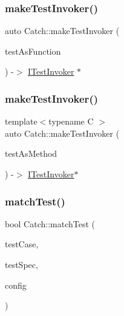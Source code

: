 \subsubsection{\texorpdfstring{make\+Test\+Invoker()}{makeTestInvoker()}\hspace{0.1cm}{\footnotesize\ttfamily [1/2]}}
{\footnotesize\ttfamily auto Catch\+::make\+Test\+Invoker (\begin{DoxyParamCaption}\item[{void($\ast$)()}]{test\+As\+Function }\end{DoxyParamCaption}) -\/$>$  \mbox{\hyperlink{structCatch_1_1ITestInvoker}{I\+Test\+Invoker}} $\ast$\hspace{0.3cm}{\ttfamily [noexcept]}}

\mbox{\label{namespaceCatch_a82a954c4d70afa716115820dc7dc8d24}} 
\subsubsection{\texorpdfstring{make\+Test\+Invoker()}{makeTestInvoker()}\hspace{0.1cm}{\footnotesize\ttfamily [2/2]}}
{\footnotesize\ttfamily template$<$typename C $>$ \\
auto Catch\+::make\+Test\+Invoker (\begin{DoxyParamCaption}\item[{void(C\+::$\ast$)()}]{test\+As\+Method }\end{DoxyParamCaption}) -\/$>$ \mbox{\hyperlink{structCatch_1_1ITestInvoker}{I\+Test\+Invoker}}$\ast$ \hspace{0.3cm}{\ttfamily [noexcept]}}

\mbox{\label{namespaceCatch_aadef80fbc6bc84589777a462770cef49}} 
\subsubsection{\texorpdfstring{match\+Test()}{matchTest()}}
{\footnotesize\ttfamily bool Catch\+::match\+Test (\begin{DoxyParamCaption}\item[{\mbox{\hyperlink{classCatch_1_1TestCase}{Test\+Case}} const \&}]{test\+Case,  }\item[{Test\+Spec const \&}]{test\+Spec,  }\item[{I\+Config const \&}]{config }\end{DoxyParamCaption})}


